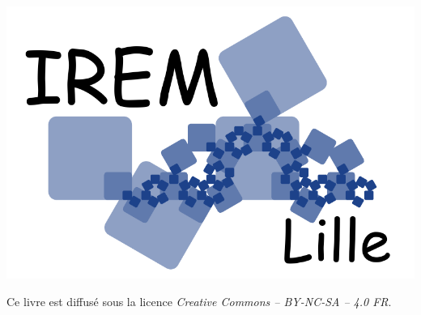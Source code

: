 \begin{center}
\qquad\qquad
\includegraphics[scale=0.15]{../divers/logo_IREM_de_Lille.pdf}\qquad\qquad
{}\qquad\qquad
{}
\end{center}



\vspace*{\fill}


\begin{center}
Ce livre est diffusé sous la licence \emph{Creative Commons -- BY-NC-SA -- 4.0 FR}.


\end{center}





